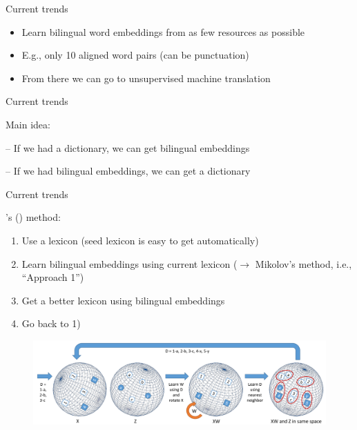 \documentclass[12pt]{beamer}
\begin{document}
\begin{frame}{Current trends}
	
\begin{itemize}
	\item Learn bilingual word embeddings from as few resources as possible
	\item E.g., only 10 aligned word pairs (can be punctuation)
	\item From there we can go to unsupervised machine translation
\end{itemize}
	
\end{frame}

\begin{frame}{Current trends}
	

Main idea:

-- If we had a dictionary, we can get bilingual embeddings

-- If we had bilingual embeddings, we can get a dictionary 


\end{frame}

\begin{frame}{Current trends}
	
\citeauthor{Artetxe.et.al.2017.ACL}'s (\citeyear{Artetxe.et.al.2017.ACL}) method:
	
\begin{enumerate}
	\item Use a lexicon (seed lexicon is easy to get automatically)
	\item Learn bilingual embeddings using current lexicon ($\to$ Mikolov’s method, i.e., “Approach 1”)
	\item Get a better lexicon using bilingual embeddings
	\item Go back to 1)
\end{enumerate}

\begin{figure}
	\includegraphics[width=0.8\linewidth]{img/artetxe.png}
\end{figure}
	
	
\end{frame}
\end{document}
